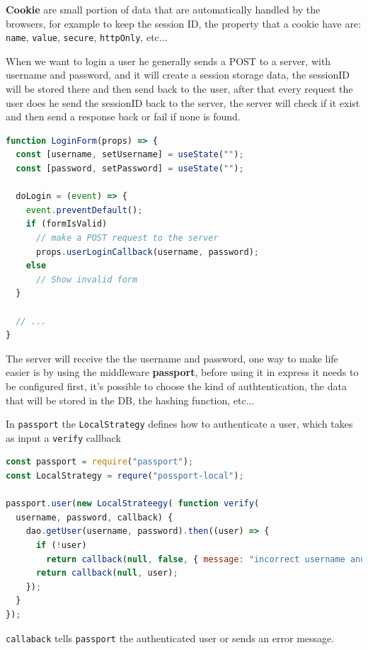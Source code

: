 \documentclass[12pt]{article}
\begin{document}
\textbf{Cookie} are small portion of data that are automatically handled by the browsers, for example to keep the session ID, the property that a cookie have are: \texttt{name}, \texttt{value}, \texttt{secure}, \texttt{httpOnly}, etc... 

When we want to login a user he generally sends a POST to a server, with username and password, and it will create a session storage data, the sessionID will be stored there and then send back to the user, after that every request the user does he send the sessionID back to the server, the server will check if it exist and then send a response back or fail if none is found.
\begin{lstlisting}[language=js]
function LoginForm(props) => {
  const [username, setUsername] = useState("");
  const [password, setPassword] = useState("");

  doLogin = (event) => {
    event.preventDefault();
    if (formIsValid)
      // make a POST request to the server
      props.userLoginCallback(username, password);
    else
      // Show invalid form
  }

  // ...
}
\end{lstlisting}
The server will receive the the username and password, one way to make life easier is by using the middleware \textbf{passport}, before using it in express it needs to be configured first, it's possible to choose the kind of authtentication, the data that will be stored in the DB, the hashing function, etc...

In \texttt{passport} the \texttt{LocalStrategy} defines how to authenticate a user, which takes as input a \texttt{verify} callback
\begin{lstlisting}[language=js]
const passport = require("passport");
const LocalStrategy = requre("possport-local");

passport.user(new LocalStrateegy( function verify(
  username, password, callback) {
    dao.getUser(username, password).then((user) => {
      if (!user)
        return callback(null, false, { message: "incorrect username and/or password." });
      return callback(null, user);
    });
  }
});
\end{lstlisting}
\texttt{callaback} tells \texttt{passport} the authenticated user or sends an error message.
\end{document}
